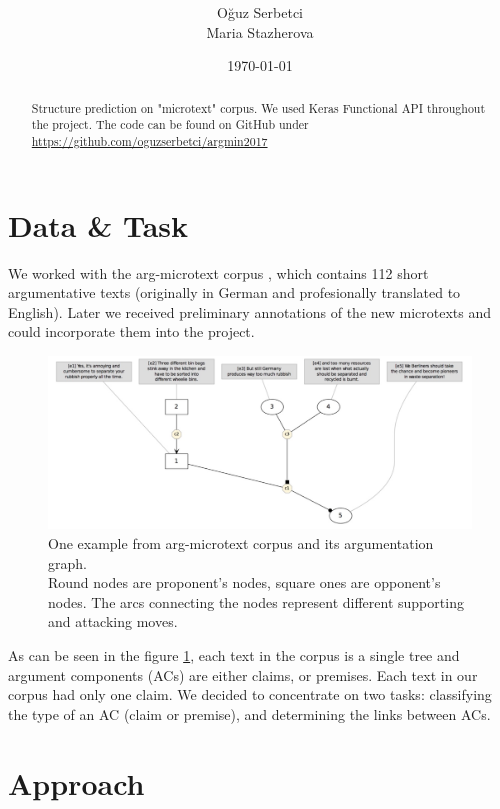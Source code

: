 \documentclass[onecolumn]{article}
\title{\spacecaps{Project module report: Argumentation Mining }\\ \normalsize \spacesc{University of Potsdam, Winter semester 2017/18} }
\author{Oğuz Serbetci\\Maria Stazherova}
\date{\today}
\begin{document}
\maketitle

\begin{abstract}

Structure prediction on "microtext" corpus. We used Keras Functional API throughout the project. The code can be found on GitHub under \url{https://github.com/oguzserbetci/argmin2017}

\end{abstract}


\section{Data \& Task}
We worked with the arg-microtext corpus \cite{peldszus2015annotated}, which contains 112 short argumentative texts 
(originally in German and profesionally translated to English). Later we received preliminary annotations of the new microtexts
and could incorporate them into the project.

\begin{figure}[h]
    \centering
    \includegraphics[width=0.8\linewidth]{fig/microtext.jpg}
    \caption{One example from arg-microtext corpus and its argumentation graph.
            \\Round nodes are proponent's nodes, square ones are opponent's nodes. The arcs connecting the nodes represent different supporting and attacking moves.}
    \label{fig:microtext}
        \end{figure}

As can be seen in the figure \ref{fig:microtext}, each text in the corpus is a single tree and argument components (ACs) are either claims, or premises. 
Each text in our corpus had only one claim. 
We decided to concentrate on two tasks: classifying the type of an AC (claim or premise), and determining the links between ACs.

\section{Approach}
\end{document}
